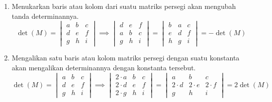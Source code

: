         \begin{enumerate}
            \item Menukarkan baris atau kolom dari suatu matriks persegi akan mengubah tanda determinannya.
            \[\det(M) = 
            \begin{vmatrix}
                a & b & c \\    
                d & e & f \\
                g & h & i 
            \end{vmatrix} 
            \implies
            \begin{vmatrix}
                d & e & f \\
                a & b & c \\    
                g & h & i 
            \end{vmatrix} 
            = 
            \begin{vmatrix}
                 b & a & c \\    
                 e & d & f \\
                 h & g & i 
            \end{vmatrix} 
            =
            -\det(M)
            \]
            
            \item Mengalikan satu baris atau kolom matriks persegi dengan suatu konstanta akan mengalikan determinannya dengan konstanta tersebut.
            \[\det(M) = 
            \begin{vmatrix}
                a & b & c \\    
                d & e & f \\
                g & h & i 
            \end{vmatrix} 
            \implies
            \begin{vmatrix}
                2\cdot a & b & c \\    
                2\cdot d & e & f \\
                2\cdot g & h & i 
            \end{vmatrix} 
            = 
            \begin{vmatrix}
                a & b & c \\    
                2\cdot d & 2\cdot e & 2\cdot f \\
                g & h & i 
            \end{vmatrix} 
            =
            2\det(M)
            \]


\end{enumerate}
